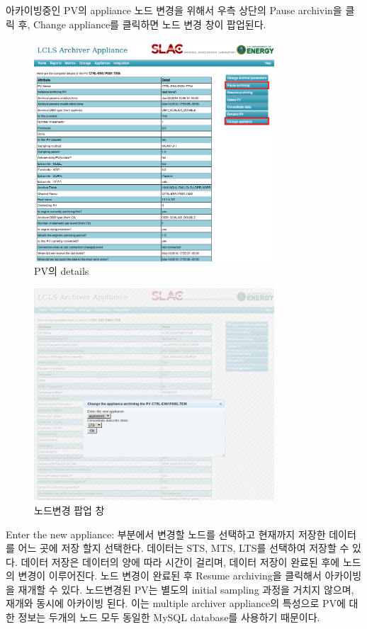 \documentclass[11pt
  , a4paper
  , article
  , oneside
]{memoir}
\begin{document}
아카이빙중인 PV의 appliance 노드 변경을 위해서 우측 상단의 Pause archivin을 클릭 후, Change appliance를 클릭하면 노드 변경 창이 팝업된다.
\clearpage
\begin{figure}[h!]
	\centering
	\includegraphics[width=0.8\textwidth, height=0.4\textheight]{./images/Selection_005.png}
	\caption{PV의 details}
\end{figure}
\begin{figure}[h!]
	\centering
	\includegraphics[width=0.8\textwidth, height=0.4\textheight]{./images/Selection_004.png}
	\caption{노드변경 팝업 창}
\end{figure}
Enter the new appliance: 부분에서 변경할 노드를 선택하고 현재까지 저장한 데이터를 어느 곳에 저장 할지 선택한다. 데이터는 STS, MTS, LTS를 선택하여 저장할 수 있다. 데이터 저장은 데이터의 양에 따라 시간이 걸리며, 데이터 저장이 완료된 후에 노드의 변경이 이루어진다. 노드 변경이 완료된 후 Resume archiving을 클릭해서 아카이빙을 재개할 수 있다. 노드변경된 PV는 별도의 initial sampling 과정을 거치지 않으며, 재개와 동시에 아카이빙 된다. 이는 multiple archiver appliance의 특성으로 PV에 대한 정보는 두개의 노드 모두 동일한 MySQL database를 사용하기 때문이다.
\end{document}

